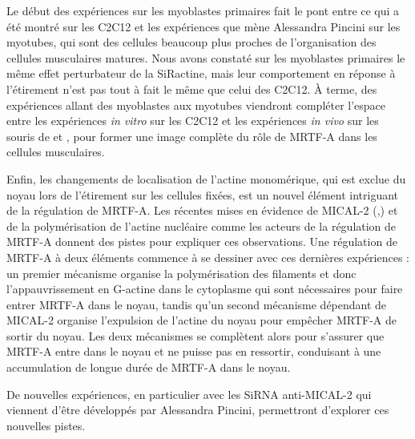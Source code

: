 Le début des expériences sur les myoblastes primaires fait le pont entre ce qui a été montré sur les C2C12 et les expériences que mène Alessandra Pincini sur les myotubes, qui sont des cellules beaucoup plus proches de l'organisation des cellules musculaires matures. 
Nous avons constaté sur les myoblastes primaires le même effet perturbateur de la SiRactine, mais leur comportement en réponse à l'étirement n'est pas tout à fait le même que celui des C2C12. 
À terme, des expériences allant des myoblastes aux myotubes viendront compléter l'espace entre les expériences \textit{in vitro} sur les C2C12 et les expériences \textit{in vivo} sur les souris de \cite{guerci_srf-dependent_2012} et \cite{collard_nuclear_2014}, pour former une image complète du rôle de MRTF-A dans les cellules musculaires. 

Enfin, les changements de localisation de l'actine monomérique, qui est exclue du noyau lors de l'étirement sur les cellules fixées, est un nouvel élément intriguant de la régulation de MRTF-A. Les récentes mises en évidence de MICAL-2  (\cite{lundquist_redox_2014},\cite{collard_nuclear_2014}) et de la polymérisation de l'actine nucléaire \parencite{baarlink_nuclear_2013} comme les acteurs de la régulation de MRTF-A donnent des pistes pour expliquer ces observations. Une régulation de MRTF-A à deux éléments commence à se dessiner avec ces dernières expériences : un premier mécanisme organise la polymérisation des filaments et donc l'appauvrissement en G-actine dans le cytoplasme qui sont nécessaires pour faire entrer MRTF-A dans le noyau, tandis qu'un second mécanisme dépendant de MICAL-2 organise l'expulsion de l'actine du noyau pour empêcher MRTF-A de sortir du noyau. Les deux mécanismes se complètent alors pour s'assurer que MRTF-A entre dans le noyau et ne puisse pas en ressortir, conduisant à une accumulation de longue durée de MRTF-A dans le noyau.

De nouvelles expériences, en particulier avec les SiRNA anti-MICAL-2 qui viennent d'être développés par Alessandra Pincini, permettront d'explorer ces nouvelles pistes.  





%

